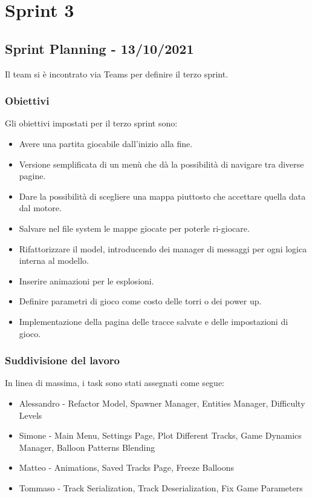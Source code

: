 \section{Sprint 3}
\subsection{Sprint Planning - 13/10/2021}
Il team si è incontrato via Teams per definire il terzo sprint.

\subsubsection{Obiettivi}
Gli obiettivi impostati per il terzo sprint sono:
\begin{itemize}
    \item Avere una partita giocabile dall'inizio alla fine.
    \item Versione semplificata di un menù che dà la possibilità di navigare tra diverse pagine.
    \item Dare la possibilità di scegliere una mappa piuttosto che accettare quella data dal motore.
    \item Salvare nel file system le mappe giocate per poterle ri-giocare.
    \item Rifattorizzare il model, introducendo dei manager di messaggi per ogni logica interna al modello.
    \item Inserire animazioni per le esplosioni.
    \item Definire parametri di gioco come costo delle torri o dei power up.
    \item Implementazione della pagina delle tracce salvate e delle impostazioni di gioco.
\end{itemize}

\subsubsection{Suddivisione del lavoro}
In linea di massima, i task sono stati assegnati come segue:
\begin{itemize}
    \item Alessandro - Refactor Model, Spawner Manager, Entities Manager, Difficulty Levels
    \item Simone - Main Menu, Settings Page, Plot Different Tracks, Game Dynamics Manager, Balloon Patterns Blending
    \item Matteo - Animations, Saved Tracks Page, Freeze Balloons
    \item Tommaso - Track Serialization, Track Deserialization, Fix Game Parameters
\end{itemize}

